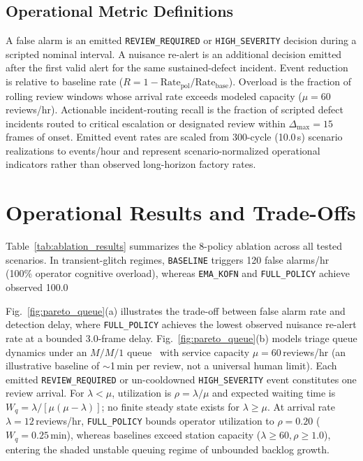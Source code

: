\documentclass[conference]{IEEEtran}
\begin{document}
\subsection{Operational Metric Definitions}
A false alarm is an emitted \texttt{REVIEW\_REQUIRED} or \texttt{HIGH\_SEVERITY} decision during a scripted nominal interval. A nuisance re-alert is an additional decision emitted after the first valid alert for the same sustained-defect incident. Event reduction is relative to baseline rate ($R = 1 - \mathrm{Rate}_{\mathrm{pol}}/\mathrm{Rate}_{\mathrm{base}}$). Overload is the fraction of rolling review windows whose arrival rate exceeds modeled capacity ($\mu = 60$\,reviews/hr). Actionable incident-routing recall is the fraction of scripted defect incidents routed to critical escalation or designated review within $\Delta_{\max} = 15$ frames of onset. Emitted event rates are scaled from 300-cycle (10.0\,s) scenario realizations to events/hour and represent scenario-normalized operational indicators rather than observed long-horizon factory rates.

\section{Operational Results and Trade-Offs}
Table~\ref{tab:ablation_results} summarizes the 8-policy ablation across all tested scenarios. In transient-glitch regimes, \texttt{BASELINE} triggers 120 false alarms/hr (100\% operator cognitive overload), whereas \texttt{EMA\_KOFN} and \texttt{FULL\_POLICY} achieve observed 100.0%

Fig.~\ref{fig:pareto_queue}(a) illustrates the trade-off between false alarm rate and detection delay, where \texttt{FULL\_POLICY} achieves the lowest observed nuisance re-alert rate at a bounded 3.0-frame delay. Fig.~\ref{fig:pareto_queue}(b) models triage queue dynamics under an $M/M/1$ queue~\cite{shortle2018fundamentals} with service capacity $\mu = 60$\,reviews/hr (an illustrative baseline of $\sim$1\,min per review, not a universal human limit). Each emitted \texttt{REVIEW\_REQUIRED} or un-cooldowned \texttt{HIGH\_SEVERITY} event constitutes one review arrival. For $\lambda < \mu$, utilization is $\rho = \lambda / \mu$ and expected waiting time is $W_q = \lambda / [\mu(\mu - \lambda)]$; no finite steady state exists for $\lambda \ge \mu$. At arrival rate $\lambda = 12$\,reviews/hr, \texttt{FULL\_POLICY} bounds operator utilization to $\rho = 0.20$ ($W_q = 0.25$\,min), whereas baselines exceed station capacity ($\lambda \ge 60, \rho \ge 1.0$), entering the shaded unstable queuing regime of unbounded backlog growth.
\end{document}
